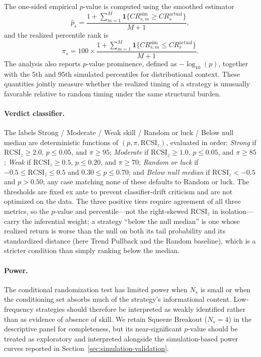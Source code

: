 \documentclass[preprint,12pt]{elsarticle}
\theoremstyle{definition}
\begin{document}
The one-sided empirical \(p\)-value is computed using the smoothed estimator
\begin{equation}
\hat{p}_s
=
\frac{1+\sum_{m=1}^{M}\mathbf{1}\{CR_{s,m}^{\mathrm{sim}}\ge CR_s^{\mathrm{actual}}\}}{M+1},
\end{equation}
and the realized percentile rank is
\begin{equation}
\pi_s
=
100\times
\frac{1+\sum_{m=1}^{M}\mathbf{1}\{CR_{s,m}^{\mathrm{sim}}\le CR_s^{\mathrm{actual}}\}}{M+1}.
\end{equation}
The analysis also reports \(p\)-value prominence, defined as \(-\log_{10}(p)\), together with the 5th and 95th simulated percentiles for distributional context. These quantities jointly measure whether the realized timing of a strategy is unusually favorable relative to random timing under the same structural burden.

\paragraph{Verdict classifier.} The labels Strong / Moderate / Weak skill / Random or luck / Below null median are deterministic functions of $(p, \pi, \mathrm{RCSI}_z)$, evaluated in order: \emph{Strong} if $\mathrm{RCSI}_z \ge 2.0$, $p\le 0.05$, and $\pi\ge 95$; \emph{Moderate} if $\mathrm{RCSI}_z\ge 1.0$, $p\le 0.05$, and $\pi\ge 85$; \emph{Weak} if $\mathrm{RCSI}_z\ge 0.5$, $p\le 0.20$, and $\pi\ge 70$; \emph{Random or luck} if $-0.5\le\mathrm{RCSI}_z\le 0.5$ and $0.30\le p\le 0.70$; and \emph{Below null median} if $\mathrm{RCSI}_z<-0.5$ and $p>0.50$; any case matching none of these defaults to Random or luck. The thresholds are fixed ex ante to prevent classifier-drift criticism and are not optimized on the data. The three positive tiers require agreement of all three metrics, so the $p$-value and percentile---not the right-skewed $\mathrm{RCSI}_z$ in isolation---carry the inferential weight; a strategy ``below the null median'' is one whose realized return is worse than the null on both its tail probability and its standardized distance (here Trend Pullback and the Random baseline), which is a stricter condition than simply ranking below the median.

\paragraph{Power.} The conditional randomization test has limited power when $N_s$ is small or when the conditioning set absorbs much of the strategy's informational content. Low-frequency strategies should therefore be interpreted as weakly identified rather than as evidence of absence of skill. We retain Squeeze Breakout ($N_s=4$) in the descriptive panel for completeness, but its near-significant $p$-value should be treated as exploratory and interpreted alongside the simulation-based power curves reported in Section~\ref{sec:simulation-validation}.
\end{document}
